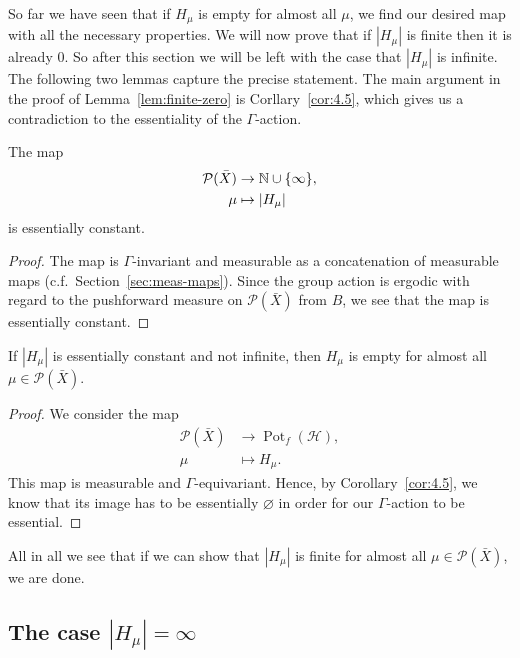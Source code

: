 So far we have seen that if \(H_\mu\) is empty for almost all \(\mu\), we find our desired map with all the necessary properties. We will now prove that if \(|H_\mu|\) is finite then it is already 0. So after this section we will be left with the case that \(|H_\mu|\) is infinite. The following two lemmas capture the precise statement. The main argument in the proof of Lemma~\ref{lem:finite-zero} is Corllary~\ref{cor:4.5}, which gives us a contradiction to the essentiality of the \(\Gamma\)-action.

\begin{lemma}
  \label{lem:h-const}
  The map
  \begin{align*}
    \mathcal{P}(\bar X) &\to \mathbb{N} \cup \{\infty\},\\
    \mu &\mapsto |H_\mu|
  \end{align*}
  is essentially constant.
\end{lemma}

\begin{proof}
  The map is \(\Gamma\)-invariant and measurable as a concatenation of measurable maps (c.f.~Section~\ref{sec:meas-maps}). Since the group action is ergodic with regard to the pushforward measure on \(\mathcal{P}(\bar X)\) from \(B\), we see that the map is essentially constant.
\end{proof}

\begin{lemma}
  \label{lem:finite-zero}
  If \(|H_\mu|\) is essentially constant and not infinite, then \(H_\mu\) is empty for almost all \(\mu \in \mathcal{P}(\bar X)\).
\end{lemma}

\begin{proof}
  We consider the map
  \begin{align*}
    \mathcal{P}(\bar X) & \to \operatorname{Pot}_f(\mathcal{H}),\\
    \mu & \mapsto H_\mu.
  \end{align*}
  This map is measurable and \(\Gamma\)-equivariant. Hence, by Corollary~\ref{cor:4.5}, we know that its image has to be essentially \(\varnothing\) in order for our \(\Gamma\)-action to be essential.
\end{proof}

All in all we see that if we can show that \(|H_\mu|\) is finite for almost all \(\mu \in \mathcal{P}(\bar X)\), we are done. 

\subsection{The case \(|H_\mu| = \infty\)}
\label{sec:N=infty}

